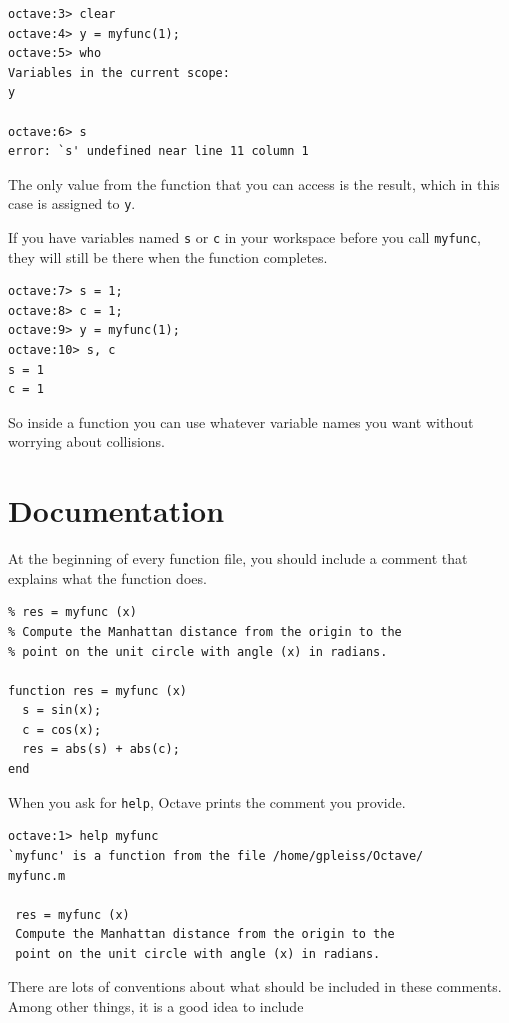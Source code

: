 \documentclass{book}
\begin{document}
\begin{verbatim}
octave:3> clear
octave:4> y = myfunc(1);
octave:5> who
Variables in the current scope:
y

octave:6> s
error: `s' undefined near line 11 column 1
\end{verbatim}

The only value from the function that you can access is the result,
which in this case is assigned to {\tt y}.

If you have variables named {\tt s} or {\tt c} in your workspace
before you call {\tt myfunc}, they will still be there when the
function completes.

\begin{verbatim}
octave:7> s = 1;
octave:8> c = 1;
octave:9> y = myfunc(1);
octave:10> s, c
s = 1
c = 1
\end{verbatim}

So inside a function you can use whatever variable names you
want without worrying about collisions.


\section{Documentation}

At the beginning of every function file, you should include a comment
that explains what the function does.

\begin{verbatim}
% res = myfunc (x)
% Compute the Manhattan distance from the origin to the
% point on the unit circle with angle (x) in radians.

function res = myfunc (x)
  s = sin(x);
  c = cos(x);
  res = abs(s) + abs(c);
end
\end{verbatim}

When you ask for {\tt help}, Octave prints the comment you
provide.

\begin{verbatim}
octave:1> help myfunc
`myfunc' is a function from the file /home/gpleiss/Octave/
myfunc.m

 res = myfunc (x)
 Compute the Manhattan distance from the origin to the
 point on the unit circle with angle (x) in radians.
\end{verbatim}

There are lots of conventions about what should be included
in these comments. Among other things, it is a good idea to
include
\end{document}
